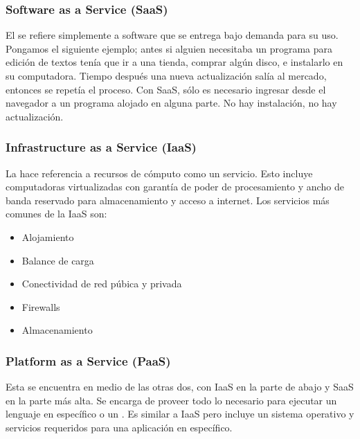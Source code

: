 \subsubsection{Software as a Service (SaaS)}
\label{\detokenize{chapter_one/cloud_computing:software-as-a-service-saas}}
El  se refiere simplemente a software que se entrega
bajo demanda para su uso. Pongamos el siguiente ejemplo; antes si alguien necesitaba
un programa para edición de textos tenía que ir a una tienda, comprar algún disco, e instalarlo
en su computadora. Tiempo después una nueva actualización salía al mercado, entonces
se repetía el proceso.
Con SaaS, sólo es necesario ingresar desde el navegador a un programa
alojado en alguna parte. No hay instalación, no hay actualización.


\subsubsection{Infrastructure as a Service (IaaS)}
\label{\detokenize{chapter_one/cloud_computing:infrastructure-as-a-service-iaas}}
La  hace referencia a recursos de cómputo como un servicio.
Esto incluye computadoras
virtualizadas con garantía de poder de procesamiento y ancho de banda reservado para
almacenamiento y acceso a internet. Los servicios más comunes de la IaaS son:
\begin{itemize}
\item {} 
Alojamiento

\item {} 
Balance de carga

\item {} 
Conectividad de red púbica y privada

\item {} 
Firewalls

\item {} 
Almacenamiento

\end{itemize}


\subsubsection{Platform as a Service (PaaS)}
\label{\detokenize{chapter_one/cloud_computing:platform-as-a-service-paas}}
Esta se encuentra en medio de las otras dos,
con IaaS en la parte de abajo y SaaS en la parte más alta.
Se encarga de proveer todo lo necesario para ejecutar
un lenguaje en específico o un . Es similar a IaaS pero incluye
un sistema operativo y servicios requeridos para una aplicación en específico.


